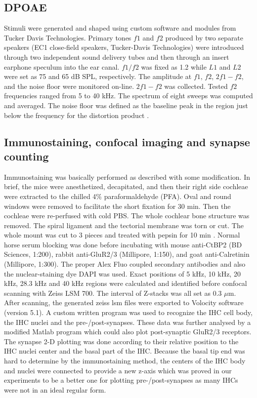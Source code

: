 \documentclass[11pt]{article}
\begin{document}
\subsection {DPOAE}
Stimuli were generated and shaped using custom software and modules from Tucker Davis Technologies. Primary tones $f1$ and $f2$ produced by two separate speakers (EC1 close-field speakers, Tucker-Davis Technologies) were introduced through two independent sound delivery tubes and then through an insert earphone speculum into the ear canal. $f1/f2$ was fixed as 1.2 while $L1$ and $L2$ were set as 75 and 65 dB SPL, respectively. The amplitude at $f1$, $f2$, $2f1-f2$, and the noise floor were monitored on-line. $2f1-f2$ was collected. Tested $f2$ frequencies ranged from 5 to 40 kHz. The spectrum of eight sweeps was computed and averaged. The noise floor was defined as the baseline peak in the region just below the frequency for the distortion product \cite{Harding2002}.

\subsection {Immunostaining, confocal imaging and synapse counting}
Immunostaining was basically performed as described \cite{Liberman2011} with some modification. In brief, the mice were anesthetized, decapitated, and then their right side cochleae were extracted to the chilled 4\% paraformaldehyde (PFA). Oval and round windows were removed to facilitate the short fixation for 30 min. Then the cochleae were re-perfused with cold PBS. The whole cochlear bone structure was removed. The spiral ligament and the tectorial membrane was torn or cut. The whole mount was cut to 3 pieces and treated with pepsin for 10 min \cite{Nagy2004}. Normal horse serum blocking was done before incubating with mouse anti-CtBP2 (BD Sciences, 1:200), rabbit anti-GluR2/3 (Millipore, 1:150), and goat anti-Calretinin (Millipore, 1:300). The proper Alex Fluo coupled secondary antibodies and also the nuclear-staining dye DAPI was used. Exact positions of 5 kHz, 10 kHz, 20 kHz, 28.3 kHz and 40 kHz regions were calculated \cite{Viberg2004} and identified before confocal scanning with Zeiss LSM 700. The interval of Z-stacks was all set as 0.3 $\mu$m. After scanning, the generated zeiss lsm files were exported to Volocity software (version 5.1). A custom written program was used to recognize the IHC cell body, the IHC nuclei and the pre-/post-synapses. These data was further analysed by a modified Matlab program which could also plot post-synaptic GluR2/3 receptors. The synapse 2-D plotting was done according to their relative position to the IHC nuclei center and the basal part of the IHC. Because the basal tip end was hard to determine by the immunostaining method, the centers of the IHC body and nuclei were connected to provide a new z-axis which was proved in our experiments to be a better one for plotting pre-/post-synapses as many IHCs were not in an ideal regular form.
\end{document}
